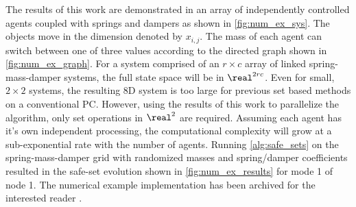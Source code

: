 The results of this work are demonstrated in an array of independently controlled agents coupled with springs and dampers as shown in \autoref{fig:num_ex_sys}. The objects move in the dimension denoted by $x_{i,j}$. The mass of each agent can switch between one of three values according to the directed graph shown in \autoref{fig:num_ex_graph}.  For a system comprised of an $r\times c$ array of linked spring-mass-damper systems, the full state space will be in $\real^{2rc}$. Even for small, $2\times 2$ systems, the resulting 8D system is  too large for previous set based methods on a conventional PC.  However, using the results of this work to parallelize the algorithm, only set operations in $\real^2$ are required. Assuming each agent has it's own independent processing, the computational complexity will grow at a sub-exponential rate with the number of agents. Running \autoref{alg:safe_sets} on the spring-mass-damper grid with randomized masses and spring/damper coefficients resulted in the safe-set evolution shown in \autoref{fig:num_ex_results} for mode 1 of node 1. The numerical example implementation has been archived for the interested reader \cite{PaperSoftware}. 